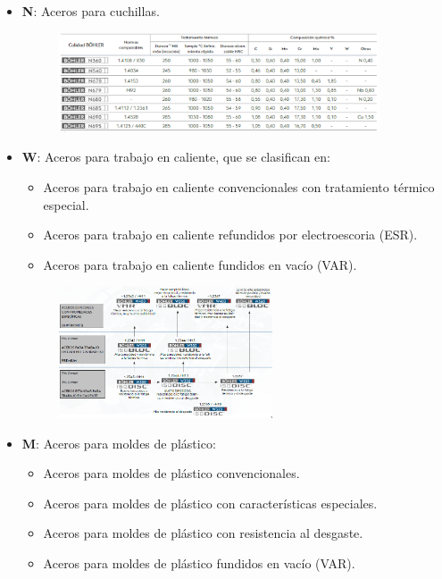 \documentclass[12pt,a4paper]{article}
\begin{document}
\begin{itemize}
\begin{figure}[H]
    \end{figure}
    \item \textbf{N}: Aceros para cuchillas.
    \begin{figure}[H]    
        \centering         
        \includegraphics[width=0.9\textwidth]{Inagenes para latex/3.png}
    \end{figure}
    \item \textbf{W}: Aceros para trabajo en caliente, que se clasifican en:
    \begin{itemize}
        \item Aceros para trabajo en caliente convencionales con tratamiento térmico especial.
        \item Aceros para trabajo en caliente refundidos por electroescoria (ESR).
        \item Aceros para trabajo en caliente fundidos en vacío (VAR).
    \end{itemize}
    \begin{figure}[H]    
        \centering         
        \includegraphics[width=0.6\textwidth]{Inagenes para latex/4.png}
    \end{figure}
    \item \textbf{M}: Aceros para moldes de plástico:
    \begin{itemize}
        \item Aceros para moldes de plástico convencionales.
        \item Aceros para moldes de plástico con características especiales.
        \item Aceros para moldes de plástico con resistencia al desgaste.
        \item Aceros para moldes de plástico fundidos en vacío (VAR).

\end{itemize}
\end{itemize}
\end{document}
